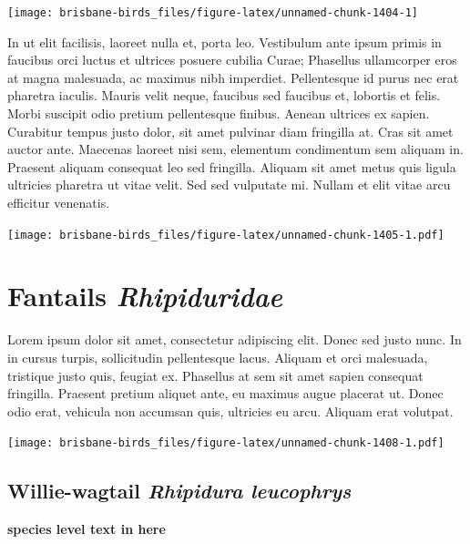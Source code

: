 \documentclass[]{book}
\let\origfigure\figure
\let\endorigfigure\endfigure
\renewenvironment{figure}[1][2] {
  \expandafter\origfigure\expandafter[H]
} {
  \endorigfigure
}
\begin{document}
\begin{figure}
\texttt{[image: brisbane-birds\_files/figure-latex/unnamed-chunk-1404-1]} \caption{insert figure caption}\label{fig:unnamed-chunk-1404}
\end{figure}

In ut elit facilisis, laoreet nulla et, porta leo. Vestibulum ante ipsum
primis in faucibus orci luctus et ultrices posuere cubilia Curae;
Phasellus ullamcorper eros at magna malesuada, ac maximus nibh
imperdiet. Pellentesque id purus nec erat pharetra iaculis. Mauris velit
neque, faucibus sed faucibus et, lobortis et felis. Morbi suscipit odio
pretium pellentesque finibus. Aenean ultrices ex sapien. Curabitur
tempus justo dolor, sit amet pulvinar diam fringilla at. Cras sit amet
auctor ante. Maecenas laoreet nisi sem, elementum condimentum sem
aliquam in. Praesent aliquam consequat leo sed fringilla. Aliquam sit
amet metus quis ligula ultricies pharetra ut vitae velit. Sed sed
vulputate mi. Nullam et elit vitae arcu efficitur venenatis.

\begin{figure}
\centering
\texttt{[image: brisbane-birds\_files/figure-latex/unnamed-chunk-1405-1.pdf]}
\caption{\label{fig:unnamed-chunk-1405}insert figure caption}
\end{figure}

\chapter{\texorpdfstring{Fantails
\emph{Rhipiduridae}}{Fantails Rhipiduridae}}\label{fantails-rhipiduridae}

Lorem ipsum dolor sit amet, consectetur adipiscing elit. Donec sed justo
nunc. In in cursus turpis, sollicitudin pellentesque lacus. Aliquam et
orci malesuada, tristique justo quis, feugiat ex. Phasellus at sem sit
amet sapien consequat fringilla. Praesent pretium aliquet ante, eu
maximus augue placerat ut. Donec odio erat, vehicula non accumsan quis,
ultricies eu arcu. Aliquam erat volutpat.

\texttt{[image: brisbane-birds\_files/figure-latex/unnamed-chunk-1408-1.pdf]}

\section{\texorpdfstring{Willie-wagtail \emph{Rhipidura
leucophrys}}{Willie-wagtail Rhipidura leucophrys}}\label{willie-wagtail-rhipidura-leucophrys}

\textbf{species level text in here}
\end{document}

